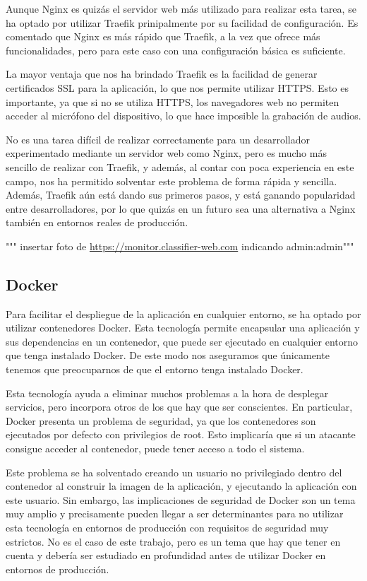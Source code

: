 Aunque Nginx es quizás el servidor web más utilizado para realizar esta tarea, se ha optado por utilizar Traefik prinipalmente por su facilidad de configuración.
Es comentado que Nginx es más rápido que Traefik, a la vez que ofrece más funcionalidades, pero para este caso con una configuración básica es suficiente.

La mayor ventaja que nos ha brindado Traefik es la facilidad de generar certificados SSL para la aplicación, lo que nos permite utilizar HTTPS.
Esto es importante, ya que si no se utiliza HTTPS, los navegadores web no permiten acceder al micrófono del dispositivo, lo que hace imposible la grabación de audios.

No es una tarea difícil de realizar correctamente para un desarrollador experimentado mediante un servidor web como Nginx, pero es mucho más sencillo de realizar con Traefik, y además, al contar con poca experiencia en este campo, nos ha permitido solventar este problema de forma rápida y sencilla.
Además, Traefik aún está dando sus primeros pasos, y está ganando popularidad entre desarrolladores, por lo que quizás en un futuro sea una alternativa a Nginx también en entornos reales de producción.

""" insertar foto de \url{https://monitor.classifier-web.com} indicando admin:admin"""

\subsection{Docker}
Para facilitar el despliegue de la aplicación en cualquier entorno, se ha optado por utilizar contenedores Docker.
Esta tecnología permite encapsular una aplicación y sus dependencias en un contenedor, que puede ser ejecutado en cualquier entorno que tenga instalado Docker.
De este modo nos aseguramos que únicamente tenemos que preocuparnos de que el entorno tenga instalado Docker.

Esta tecnología ayuda a eliminar muchos problemas a la hora de desplegar servicios, pero incorpora otros de los que hay que ser conscientes.
En particular, Docker presenta un problema de seguridad, ya que los contenedores son ejecutados por defecto con privilegios de root.
Esto implicaría que si un atacante consigue acceder al contenedor, puede tener acceso a todo el sistema.

Este problema se ha solventado creando un usuario no privilegiado dentro del contenedor al construir la imagen de la aplicación, y ejecutando la aplicación con este usuario.
Sin embargo, las implicaciones de seguridad de Docker son un tema muy amplio y precisamente pueden llegar a ser determinantes para no utilizar esta tecnología en entornos de producción con requisitos de seguridad muy estrictos.
No es el caso de este trabajo, pero es un tema que hay que tener en cuenta y debería ser estudiado en profundidad antes de utilizar Docker en entornos de producción.


